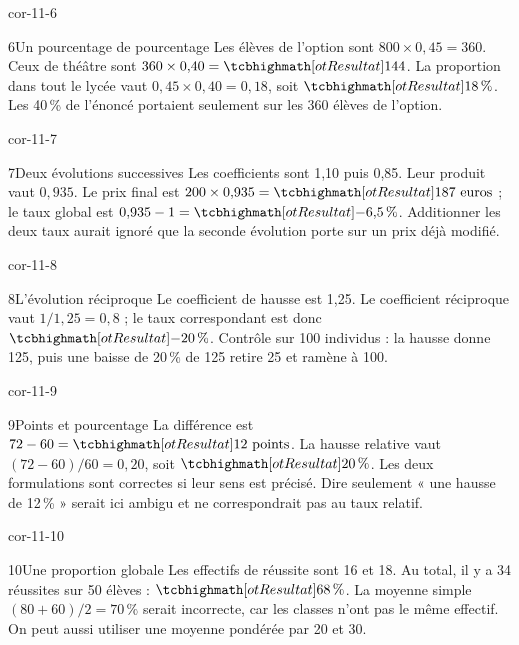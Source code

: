 \begin{blocLivre}{cor-11-6}
\begin{corrige}{6}{Un pourcentage de pourcentage}
Les élèves de l’option sont $800\times0{,}45=360$. Ceux de théâtre sont $360\times0{,}40=\res{144}$. La proportion dans tout le lycée vaut $0{,}45\times0{,}40=0{,}18$, soit $\res{18\,\%}$. Les 40\,\% de l’énoncé portaient seulement sur les 360 élèves de l’option.
\label{fig-cor-11-6}
\end{corrige}
\end{blocLivre}
\begin{blocLivre}{cor-11-7}
\begin{corrige}{7}{Deux évolutions successives}
Les coefficients sont 1,10 puis 0,85. Leur produit vaut $0{,}935$. Le prix final est $200\times0{,}935=\res{187\text{ euros}}$ ; le taux global est $0{,}935-1=\res{-6{,}5\,\%}$. Additionner les deux taux aurait ignoré que la seconde évolution porte sur un prix déjà modifié.
\end{corrige}
\end{blocLivre}
\begin{blocLivre}{cor-11-8}
\begin{corrige}{8}{L’évolution réciproque}
Le coefficient de hausse est 1,25. Le coefficient réciproque vaut $1/1{,}25=0{,}8$ ; le taux correspondant est donc $\res{-20\,\%}$. Contrôle sur 100 individus : la hausse donne 125, puis une baisse de 20\,\% de 125 retire 25 et ramène à 100.
\end{corrige}
\end{blocLivre}
\begin{blocLivre}{cor-11-9}
\begin{corrige}{9}{Points et pourcentage}
La différence est $72-60=\res{12\text{ points}}$. La hausse relative vaut $(72-60)/60=0{,}20$, soit $\res{20\,\%}$. Les deux formulations sont correctes si leur sens est précisé. Dire seulement « une hausse de 12\,\% » serait ici ambigu et ne correspondrait pas au taux relatif.
\end{corrige}
\end{blocLivre}
\begin{blocLivre}{cor-11-10}
\begin{corrige}{10}{Une proportion globale}
Les effectifs de réussite sont 16 et 18. Au total, il y a 34 réussites sur 50 élèves : $\res{68\,\%}$. La moyenne simple $(80+60)/2=70\,\%$ serait incorrecte, car les classes n’ont pas le même effectif. On peut aussi utiliser une moyenne pondérée par 20 et 30.
\end{corrige}
\end{blocLivre}
